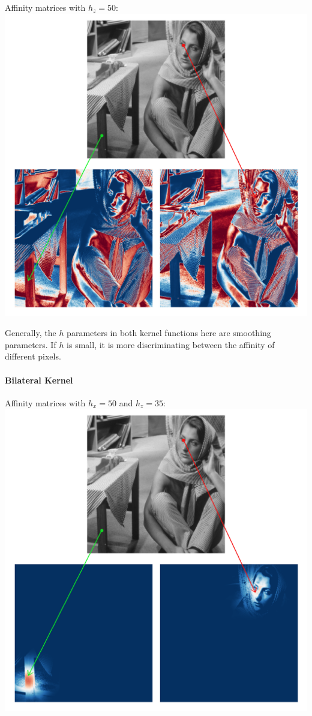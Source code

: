 Affinity matrices with \(h_z = 50\): \\
\includegraphics[width=\textwidth]{img/photometricAffinitySigma50.png}

Generally, the \(h\) parameters in both kernel functions here are smoothing parameters.
If \(h\) is small, it is more discriminating between the affinity of different pixels.

\paragraph{Bilateral Kernel}
Affinity matrices with \(h_x = 50\) and \(h_z = 35\): \\
\includegraphics[width=\textwidth]{img/bilateralAffinityPhoto35Spatial50.png}

